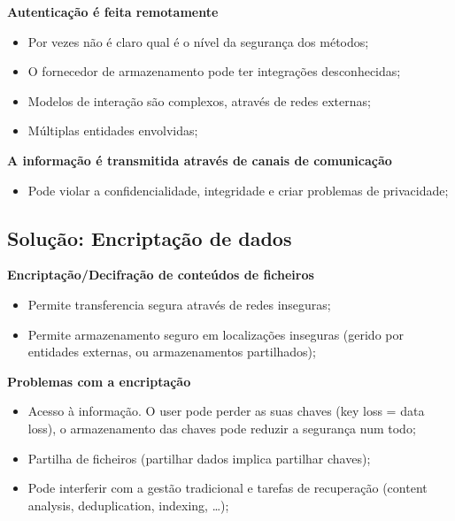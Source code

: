 \documentclass{article}
\begin{document}
\begin{flushleft}
  \textbf{Autenticação é feita remotamente}
  \begin{itemize}
    \item Por vezes não é claro qual é o nível da segurança
    dos métodos;
    \item O fornecedor de armazenamento pode ter integrações desconhecidas;
    \item Modelos de interação são complexos, através de redes externas;
    \item Múltiplas entidades envolvidas;
  \end{itemize}

  \textbf{A informação é transmitida através de canais de comunicação}
  \begin{itemize}
    \item Pode violar a confidencialidade, integridade
    e criar problemas de privacidade;
  \end{itemize}
\end{flushleft}

\pagebreak

\subsection{Solução: Encriptação de dados}

\begin{flushleft}
  \textbf{Encriptação/Decifração de conteúdos de ficheiros}
  \begin{itemize}
    \item Permite transferencia segura através de redes inseguras;
    \item Permite armazenamento seguro em localizações inseguras
    (gerido por entidades externas, ou armazenamentos partilhados);
  \end{itemize}

  \textbf{Problemas com a encriptação}
  \begin{itemize}
    \item Acesso à informação. O user pode perder as suas chaves (key loss = data loss),
    o armazenamento das chaves pode reduzir a segurança num todo;
    \item Partilha de ficheiros (partilhar dados implica partilhar chaves);
    \item Pode interferir com a gestão tradicional e tarefas de recuperação
    (content analysis, deduplication, indexing, \dots);
  \end{itemize}
\end{flushleft}
\end{document}
